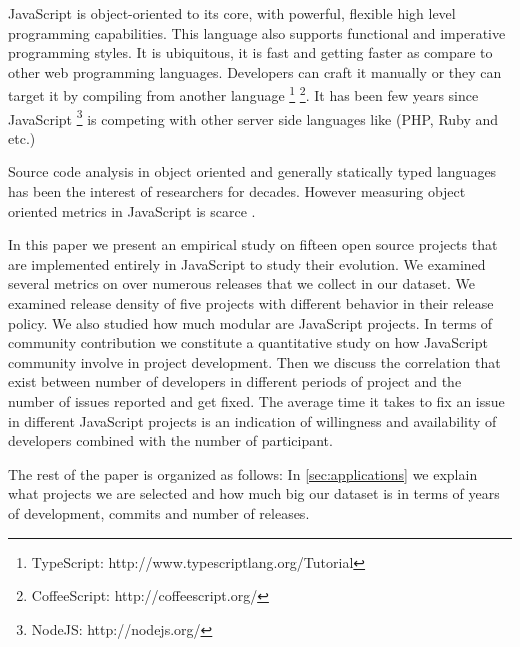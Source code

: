 
JavaScript is object-oriented to its core, with powerful, flexible high level programming capabilities. This language also supports functional and imperative programming styles. It is ubiquitous, it is fast and getting faster as compare to other web programming languages. Developers can craft it manually or they can target it by compiling from another language \footnote{TypeScript: http://www.typescriptlang.org/Tutorial} \footnote{CoffeeScript: http://coffeescript.org/}. It has been few years since JavaScript \footnote{NodeJS: http://nodejs.org/} is competing with other server side languages like (PHP, Ruby and etc.)

Source code analysis in object oriented and generally statically typed languages has been the interest of researchers for decades. However measuring object oriented metrics in JavaScript is scarce \cite{Richards:2010:ADB:1809028.1806598} \cite{6320536}.


In this paper we present an empirical study on fifteen open source projects that are implemented entirely in JavaScript to study their evolution. We examined several metrics on over numerous releases that we collect in our dataset. We examined release density of five projects with different behavior in their release policy. We also studied how much modular are JavaScript projects.
 In terms of community contribution we constitute a quantitative study on how JavaScript community involve in project development. Then we discuss the correlation that exist between number of developers in different periods of project and the number of issues reported and get fixed. The average time it takes to fix an issue in different JavaScript projects is an indication of willingness and availability of developers combined with the number of participant.

The rest of the paper is organized as follows: In \ref{sec:applications} we explain what projects we are selected and how much big our dataset is in terms of years of development, commits and number of releases.

